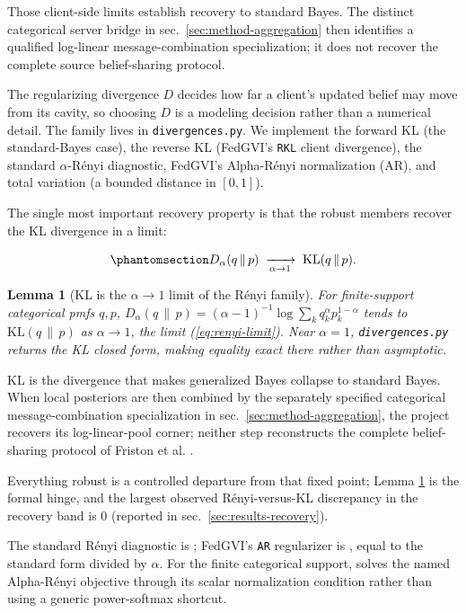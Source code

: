 \documentclass[
  english,
]{article}
\theoremstyle{plain}
\newtheorem{lemma}[theorem]{Lemma}
\theoremstyle{definition}
\theoremstyle{remark}
\theoremstyle{definition}
\begin{document}
Those client-side limits establish recovery to standard Bayes. The
distinct categorical server bridge in sec.~\ref{sec:method-aggregation}
then identifies a qualified log-linear message-combination
specialization; it does not recover the complete source belief-sharing
protocol.

The regularizing divergence \(D\) decides how far a client's updated
belief may move from its cavity, so choosing \(D\) is a modeling
decision rather than a numerical detail. The family lives in
\texttt{divergences.py}. We implement the forward KL (the standard-Bayes
case), the reverse KL (FedGVI's \texttt{RKL} client divergence), the
standard \(\alpha\)-Rényi diagnostic, FedGVI's Alpha-Rényi normalization
(AR), and total variation (a bounded distance in \([0,1]\)).

The single most important recovery property is that the robust members
recover the KL divergence in a limit:

\begin{equation}\protect\phantomsection\label{eq:renyi-limit}{D_\alpha(q \,\|\, p) \;\xrightarrow[\alpha\to 1]{}\; \mathrm{KL}(q \,\|\, p).}\end{equation}

\begin{lemma}[KL is the \(\alpha\to1\) limit of the Rényi family]\label{lem:renyi-kl-limit}
For finite-support categorical pmfs \(q, p\),
\(D_\alpha(q\,\|\,p) = (\alpha-1)^{-1}\log\sum_k q_k^\alpha p_k^{1-\alpha}\) tends
to \(\mathrm{KL}(q\,\|\,p)\) as \(\alpha\to1\), the limit
(\ref{eq:renyi-limit}). Near \(\alpha=1\), \texttt{divergences.py} returns the
KL closed form, making equality exact there rather than asymptotic.
\end{lemma}

KL is the divergence that makes generalized Bayes collapse to standard
Bayes. When local posteriors are then combined by the separately
specified categorical message-combination specialization in
sec.~\ref{sec:method-aggregation}, the project recovers its
log-linear-pool corner; neither step reconstructs the complete
belief-sharing protocol of Friston et al. \citep{friston2024federated}.

Everything robust is a controlled departure from that fixed point; Lemma
\ref{lem:renyi-kl-limit} is the formal hinge, and the largest observed
Rényi-versus-KL discrepancy in the recovery band is 0 (reported in
sec.~\ref{sec:results-recovery}).

The standard Rényi diagnostic is ; FedGVI's
\texttt{AR} regularizer is , equal to
the standard form divided by \(\alpha\). For the finite categorical
support,  solves the named Alpha-Rényi
objective through its scalar normalization condition rather than using a
generic power-softmax shortcut.
\end{document}
